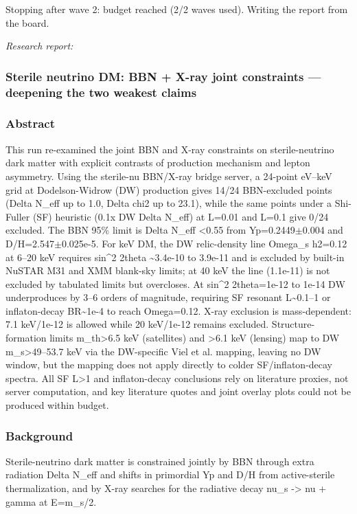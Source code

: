 \documentclass[11pt,a4paper]{article}
\begin{document}
Stopping after wave 2: budget reached (2/2 waves used). Writing the report from the board.

\textit{Research report:}\par
\subsubsection*{Sterile neutrino DM: BBN + X-ray joint constraints --- deepening the two weakest claims}
\subsubsection*{Abstract}
This run re-examined the joint BBN and X-ray constraints on sterile-neutrino dark matter with explicit contrasts of production mechanism and lepton asymmetry. Using the sterile-nu BBN/X-ray bridge server, a 24-point eV--keV grid at Dodelson-Widrow (DW) production gives 14/24 BBN-excluded points (Delta N\_eff up to 1.0, Delta chi2 up to 23.1), while the same points under a Shi-Fuller (SF) heuristic (0.1x DW Delta N\_eff) at L=0.01 and L=0.1 give 0/24 excluded. The BBN 95\% limit is Delta N\_eff \textless{}0.55 from Yp=0.2449$\pm$0.004 and D/H=2.547$\pm$0.025e-5. For keV DM, the DW relic-density line Omega\_s h2=0.12 at 6--20 keV requires sin\textasciicircum{}2 2theta \textasciitilde{}3.4e-10 to 3.9e-11 and is excluded by built-in NuSTAR M31 and XMM blank-sky limits; at 40 keV the line (1.1e-11) is not excluded by tabulated limits but overcloses. At sin\textasciicircum{}2 2theta=1e-12 to 1e-14 DW underproduces by 3--6 orders of magnitude, requiring SF resonant L\textasciitilde{}0.1--1 or inflaton-decay BR\textasciitilde{}1e-4 to reach Omega=0.12. X-ray exclusion is mass-dependent: 7.1 keV/1e-12 is allowed while 20 keV/1e-12 remains excluded. Structure-formation limits m\_th\textgreater{}6.5 keV (satellites) and \textgreater{}6.1 keV (lensing) map to DW m\_s\textgreater{}49--53.7 keV via the DW-specific Viel et al. mapping, leaving no DW window, but the mapping does not apply directly to colder SF/inflaton-decay spectra. All SF L\textgreater{}1 and inflaton-decay conclusions rely on literature proxies, not server computation, and key literature quotes and joint overlay plots could not be produced within budget.

\subsubsection*{Background}
Sterile-neutrino dark matter is constrained jointly by BBN through extra radiation Delta N\_eff and shifts in primordial Yp and D/H from active-sterile thermalization, and by X-ray searches for the radiative decay nu\_s -\textgreater{} nu + gamma at E=m\_s/2.
\end{document}
